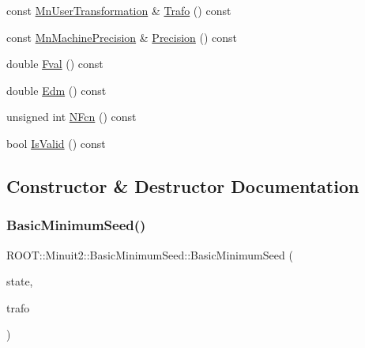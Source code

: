 \begin{DoxyCompactItemize}
\item 
const \mbox{\hyperlink{classROOT_1_1Minuit2_1_1MnUserTransformation}{Mn\+User\+Transformation}} \& \mbox{\hyperlink{classROOT_1_1Minuit2_1_1BasicMinimumSeed_aa40157cea0a8a75b56af25bbc64f8d39}{Trafo}} () const
\item 
const \mbox{\hyperlink{classROOT_1_1Minuit2_1_1MnMachinePrecision}{Mn\+Machine\+Precision}} \& \mbox{\hyperlink{classROOT_1_1Minuit2_1_1BasicMinimumSeed_af06c66e8851f7314915e01e0bedb200c}{Precision}} () const
\item 
double \mbox{\hyperlink{classROOT_1_1Minuit2_1_1BasicMinimumSeed_a40b43b611717121256cd72bf40a3d5d7}{Fval}} () const
\item 
double \mbox{\hyperlink{classROOT_1_1Minuit2_1_1BasicMinimumSeed_a10659878d070bed73df23682eab3e88e}{Edm}} () const
\item 
unsigned int \mbox{\hyperlink{classROOT_1_1Minuit2_1_1BasicMinimumSeed_a1d34718bf163936432ef05dea799c469}{N\+Fcn}} () const
\item 
bool \mbox{\hyperlink{classROOT_1_1Minuit2_1_1BasicMinimumSeed_ab53f2619d2b6be3d3d9303f8de29ab28}{Is\+Valid}} () const
\end{DoxyCompactItemize}


\subsection{Constructor \& Destructor Documentation}
\mbox{\label{classROOT_1_1Minuit2_1_1BasicMinimumSeed_aae0d1c36a05bf57a221d1930a9ffbb87}} 
\subsubsection{\texorpdfstring{BasicMinimumSeed()}{BasicMinimumSeed()}\hspace{0.1cm}{\footnotesize\ttfamily [1/6]}}
{\footnotesize\ttfamily R\+O\+O\+T\+::\+Minuit2\+::\+Basic\+Minimum\+Seed\+::\+Basic\+Minimum\+Seed (\begin{DoxyParamCaption}\item[{const \mbox{\hyperlink{classROOT_1_1Minuit2_1_1MinimumState}{Minimum\+State}} \&}]{state,  }\item[{const \mbox{\hyperlink{classROOT_1_1Minuit2_1_1MnUserTransformation}{Mn\+User\+Transformation}} \&}]{trafo }\end{DoxyParamCaption})\hspace{0.3cm}{\ttfamily [inline]}}

